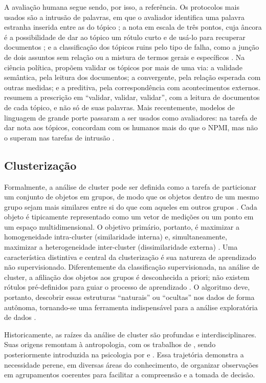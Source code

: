 A avaliação humana segue sendo, por isso, a referência. Os protocolos mais usados são a intrusão de palavras, em que o avaliador identifica uma palavra estranha inserida entre as do tópico \cite{chang2009}; a nota em escala de três pontos, cuja âncora é a possibilidade de dar ao tópico um rótulo curto e de usá-lo para recuperar documentos \cite{newman2010}; e a classificação dos tópicos ruins pelo tipo de falha, como a junção de dois assuntos sem relação ou a mistura de termos gerais e específicos \cite{mimno2011}. Na ciência política,  propõem validar os tópicos por mais de uma via: a validade semântica, pela leitura dos documentos; a convergente, pela relação esperada com outras medidas; e a preditiva, pela correspondência com acontecimentos externos.  resumem a prescrição em ``validar, validar, validar'', com a leitura de documentos de cada tópico, e não só de suas palavras. Mais recentemente, modelos de linguagem de grande porte passaram a ser usados como avaliadores: na tarefa de dar nota aos tópicos, concordam com os humanos mais do que o NPMI, mas não o superam nas tarefas de intrusão \cite{stammbach2023}.

\subsection{Clusterização}

Formalmente, a análise de cluster pode ser definida como a tarefa de particionar um conjunto de objetos em grupos, de modo que os objetos dentro de um mesmo grupo sejam mais similares entre si do que com aqueles em outros grupos \cite{jain1999, xu2005}. Cada objeto é tipicamente representado como um vetor de medições ou um ponto em um espaço multidimensional. O objetivo primário, portanto, é maximizar a homogeneidade intra-cluster (similaridade interna) e, simultaneamente, maximizar a heterogeneidade inter-cluster (dissimilaridade externa) \cite{tan2006}. Uma característica distintiva e central da clusterização é sua natureza de aprendizado não supervisionado. Diferentemente da classificação supervisionada, na análise de cluster, a afiliação dos objetos aos grupos é desconhecida a priori; não existem rótulos pré-definidos para guiar o processo de aprendizado \cite{xu2005}. O algoritmo deve, portanto, descobrir essas estruturas ``naturais'' ou ``ocultas'' nos dados de forma autônoma, tornando-se uma ferramenta indispensável para a análise exploratória de dados \cite{jain1999}.

Historicamente, as raízes da análise de cluster são profundas e interdisciplinares. Suas origens remontam à antropologia, com os trabalhos de , sendo posteriormente introduzida na psicologia por  e . Essa trajetória demonstra a necessidade perene, em diversas áreas do conhecimento, de organizar observações em agrupamentos coerentes para facilitar a compreensão e a tomada de decisão.

